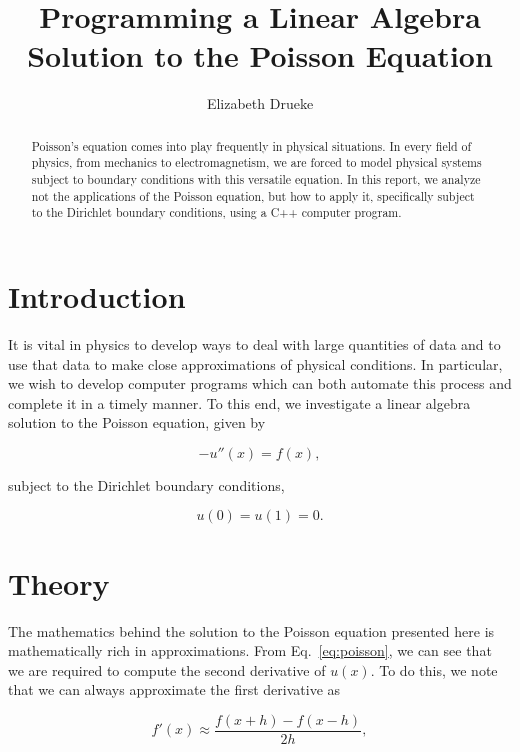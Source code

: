 \documentclass[12pt]{article}
\title{Programming a Linear Algebra Solution to the Poisson Equation}
\author{Elizabeth Drueke}
\numberwithin{equation}{section}
\begin{document}
\maketitle

\begin{abstract}
Poisson's equation comes into play frequently in physical situations.  In every field of physics, from mechanics to electromagnetism, we are forced to model physical systems subject to boundary conditions with this versatile equation.  In this report, we analyze not the applications of the Poisson equation, but how to apply it, specifically subject to the Dirichlet boundary conditions, using a C++ computer program. 
\end{abstract}

\section{Introduction}
\label{sec:into}
It is vital in physics to develop ways to deal with large quantities of data and to use that data to make close approximations of physical conditions.  In particular, we wish to develop computer programs which can both automate this process and complete it in a timely manner.  To this end, we investigate a linear algebra solution to the Poisson equation, given by 

\begin{equation}
\label{eq:poisson}
-u''\left(x\right) = f\left(x\right),
\end{equation}

\noindent subject to the Dirichlet boundary conditions,

\begin{equation}
\label{eq:dirichlet}
u\left(0\right)=u\left(1\right)=0.
\end{equation}

\section{Theory}
The mathematics behind the solution to the Poisson equation presented here is mathematically rich in approximations.  From Eq.~\ref{eq:poisson}, we can see that we are required to compute the second derivative of $u\left(x\right)$.  To do this, we note that we can always approximate the first derivative as

\begin{equation}
\label{eq:deriv1}
f'\left(x\right) \approx \frac{f\left(x+h\right)-f\left(x-h\right)}{2h},
\end{equation}
\end{document}
